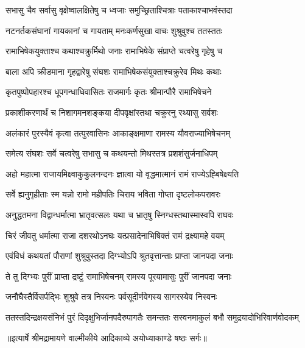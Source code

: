 \twolineshloka
{सभासु चैव सर्वासु वृक्षेष्वालक्षितेषु च}
{ध्वजाः समुच्छ्रिताश्चित्राः पताकाश्चाभवंस्तदा} %

\twolineshloka
{नटनर्तकसंघानां गायकानां च गायताम्}
{मनःकर्णसुखा वाचः शुश्रुवुश्च ततस्ततः} %

\twolineshloka
{रामाभिषेकयुक्ताश्च कथाश्चक्रुर्मिथो जनाः}
{रामाभिषेके संप्राप्ते चत्वरेषु गृहेषु च} %

\twolineshloka
{बाला अपि क्रीडमाना गृहद्वारेषु संघशः}
{रामाभिषेकसंयुक्ताश्चक्रुरेव मिथः कथाः} %

\twolineshloka
{कृतपुष्पोपहारश्च धूपगन्धाधिवासितः}
{राजमार्गः कृतः श्रीमान्पौरै रामाभिषेचने} %

\twolineshloka
{प्रकाशीकरणार्थं च निशागमनशङ्कया}
{दीपवृक्षांस्तथा चक्रुरनु रथ्यासु सर्वशः} %

\twolineshloka
{अलंकारं पुरस्यैवं कृत्वा तत्पुरवासिनः}
{आकाङ्क्षमाणा रामस्य यौवराज्याभिषेचनम्} %

\twolineshloka
{समेत्य संघशः सर्वे चत्वरेषु सभासु च}
{कथयन्तो मिथस्तत्र प्रशशंसुर्जनाधिपम्} %

\twolineshloka
{अहो महात्मा राजायमिक्ष्वाकुकुलनन्दनः}
{ज्ञात्वा यो वृद्धमात्मानं रामं राज्येऽह्बिषेक्ष्यति} %

\twolineshloka
{सर्वे ह्यनुगृहीताः स्म यन्नो रामो महीपतिः}
{चिराय भविता गोप्ता दृष्टलोकपरावरः} %

\twolineshloka
{अनुद्धतमना विद्वान्धर्मात्मा भ्रातृवत्सलः}
{यथा च भ्रातृषु स्निग्धस्तथास्मास्वपि राघवः} %

\twolineshloka
{चिरं जीवतु धर्मात्मा राजा दशरथोऽनघः}
{यत्प्रसादेनाभिषिक्तं रामं द्रक्ष्यामहे वयम्} %

\twolineshloka
{एवंविधं कथयतां पौराणां शुश्रुवुस्तदा}
{दिग्भ्योऽपि श्रुतवृत्तान्ताः प्राप्ता जानपदा जनाः} %

\twolineshloka
{ते तु दिग्भ्यः पुरीं प्राप्ता द्रष्टुं रामाभिषेचनम्}
{रामस्य पूरयामासुः पुरीं जानपदा जनाः} %

\twolineshloka
{जनौघैस्तैर्विसर्पद्भिः शुश्रुवे तत्र निस्वनः}
{पर्वसूदीर्णवेगस्य सागरस्येव निस्वनः} %

\fourlineindentedshloka
{ततस्तदिन्द्रक्षयसंनिभं पुरं}
{ दिदृक्षुभिर्जानपदैरुपागतैः}
{समन्ततः सस्वनमाकुलं बभौ}
{ समुद्रयादोभिरिवार्णवोदकम्} %


{॥इत्यार्षे श्रीमद्रामायणे वाल्मीकीये आदिकाव्ये अयोध्याकाण्डे षष्ठः सर्गः॥}


